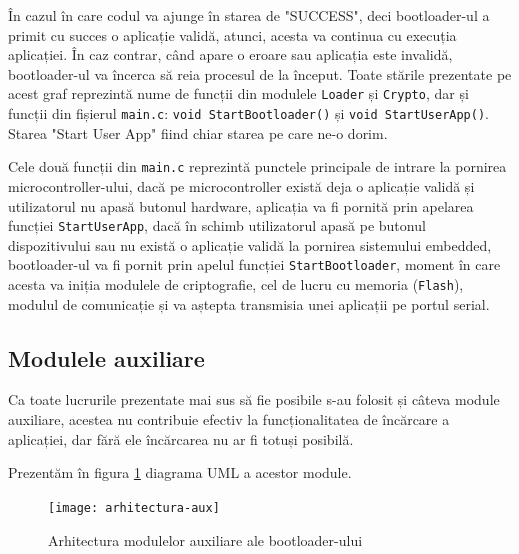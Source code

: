 \documentclass[12pt,a4paper,titlepage]{report}
\begin{document}
În cazul în care codul va ajunge în starea de "SUCCESS", deci bootloader-ul a primit cu succes o aplicație validă, atunci, acesta va continua cu execuția aplicației.
În caz contrar, când apare o eroare sau aplicația este invalidă, bootloader-ul va încerca să reia procesul de la început.
Toate stările prezentate pe acest graf reprezintă nume de funcții din modulele \texttt{Loader} și \texttt{Crypto}, dar și funcții din fișierul \texttt{main.c}: \texttt{void StartBootloader()} și \texttt{void StartUserApp()}.
Starea "Start User App" fiind chiar starea pe care ne-o dorim.

Cele două funcții din \texttt{main.c} reprezintă punctele principale de intrare la pornirea microcontroller-ului, dacă pe microcontroller există deja o aplicație validă și utilizatorul nu apasă butonul hardware, aplicația va fi pornită prin apelarea funcției \texttt{StartUserApp}, dacă în schimb utilizatorul apasă pe butonul dispozitivului sau nu există o aplicație validă la pornirea sistemului embedded, bootloader-ul va fi pornit prin apelul funcției \texttt{StartBootloader}, moment în care acesta va iniția modulele de criptografie, cel de lucru cu memoria (\texttt{Flash}), modulul de comunicație și va aștepta transmisia unei aplicații pe portul serial.

\subsection{Modulele auxiliare}

Ca toate lucrurile prezentate mai sus să fie posibile s-au folosit și câteva module auxiliare, acestea nu contribuie efectiv la funcționalitatea de încărcare a aplicației, dar fără ele încărcarea nu ar fi totuși posibilă.

Prezentăm în figura \ref{arhitectura-aux} diagrama UML a acestor module.

\begin{figure}[h]
    \centering
    \texttt{[image: arhitectura-aux]}
    \caption{Arhitectura modulelor auxiliare ale bootloader-ului}
    \label{arhitectura-aux}
\end{figure}
\end{document}
